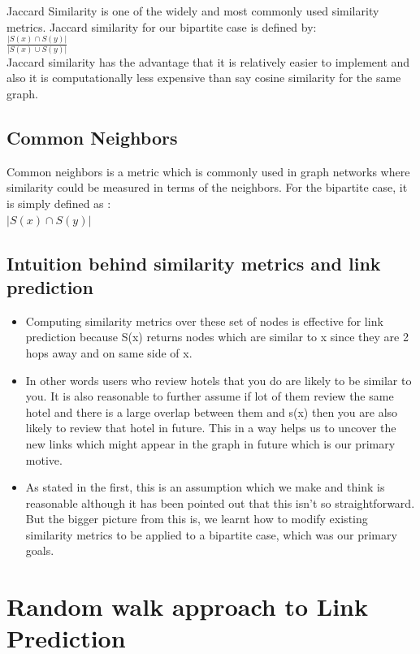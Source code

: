 \documentclass[letterpaper,twocolumn,11pt]{article}
\begin{document}
Jaccard Similarity is one of the widely and most commonly used similarity metrics. Jaccard similarity for our bipartite case is defined by:\\
$\frac {| S(x) \cap S(y) |}{| S(x) \cup S(y) |}$ \\

Jaccard similarity has the advantage that it is relatively easier to implement and also it is computationally less expensive than say cosine similarity for the same graph.

\subsection{Common Neighbors}
Common neighbors is a metric which is commonly used in graph networks where similarity could be measured in terms of the neighbors. For the bipartite case, it is simply defined as :\\
$|S(x) \cap S(y)|$

\subsection{Intuition behind similarity metrics and link prediction}

\begin{itemize}
\item Computing similarity metrics over these set of nodes is effective for link prediction because S(x) returns nodes which are similar to x since they are 2 hops away and on same side of x.

\item In other words users who review hotels that you do are likely to be similar to you. It is also reasonable to further assume if lot of them review the same hotel and there is a large overlap between them and s(x) then you are also likely to review that hotel in future. This in a way helps us to uncover the new links which might appear in the graph in future which is our primary motive.

\item As stated in the first, this is an assumption which we make and think is reasonable although it has been pointed out that this isn't so straightforward. But the bigger picture from this is, we learnt how to modify existing similarity metrics to be applied to a bipartite case, which was our primary goals.

\end{itemize}

\section{Random walk approach to Link Prediction}
\end{document}

